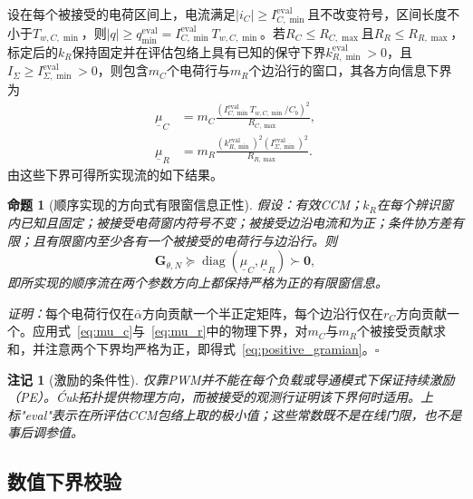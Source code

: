 \documentclass[zihao=5,a4paper]{ctexart}
\DeclareRobustCommand{\Cuk}{\mbox{\'{C}uk}}
\newcommand{\alphab}{\bar{\alpha}}
\newcommand{\vect}[1]{\bm{#1}}
\newtheorem{proposition}{命题}
\newtheorem{remark}{注记}
\begin{document}
设在每个被接受的电荷区间上，电流满足$|i_C|\ge I_{C,\min}^{\mathrm{eval}}$且不改变符号，区间长度不小于$T_{w,C,\min}$，则$|q|\ge q_{\min}^{\mathrm{eval}}=I_{C,\min}^{\mathrm{eval}}T_{w,C,\min}$。若$R_C\le R_{C,\max}$且$R_R\le R_{R,\max}$，标定后的$k_R$保持固定并在评估包络上具有已知的保守下界$k_{R,\min}^{\mathrm{eval}}>0$，且$I_\Sigma\ge I_{\Sigma,\min}^{\mathrm{eval}}>0$，则包含$m_C$个电荷行与$m_R$个边沿行的窗口，其各方向信息下界为
\begin{align}
\underline\mu_C & =m_C\frac{(I_{C,\min}^{\mathrm{eval}}T_{w,C,\min}/C_b)^2}{R_{C,\max}},
\label{eq:mu_c}\\
\underline\mu_R & =m_R\frac{(k_{R,\min}^{\mathrm{eval}})^2(I_{\Sigma,\min}^{\mathrm{eval}})^2}{R_{R,\max}}.
\label{eq:mu_r}
\end{align}
由这些下界可得所实现流的如下结果。

\begin{proposition}[顺序实现的方向式有限窗信息正性]
\label{prop:identifiability}
假设：有效CCM；$k_R$在每个辨识窗内已知且固定；被接受电荷窗内符号不变；被接受边沿电流和为正；条件协方差有限；且有限窗内至少各有一个被接受的电荷行与边沿行。则
\begin{equation}
\vect{G}_{\theta,N}\succeq
\operatorname{diag}(\underline\mu_C,\underline\mu_R)\succ\vect{0},
\label{eq:positive_gramian}
\end{equation}
即所实现的顺序流在两个参数方向上都保持严格为正的有限窗信息。
\end{proposition}

\emph{证明：}每个电荷行仅在$\alphab$方向贡献一个半正定矩阵，每个边沿行仅在$r_C$方向贡献一个。应用式~\eqref{eq:mu_c}与~\eqref{eq:mu_r}中的物理下界，对$m_C$与$m_R$个被接受贡献求和，并注意两个下界均严格为正，即得式~\eqref{eq:positive_gramian}。\hfill$\square$

\begin{remark}[激励的条件性]
\label{rem:conditional}
仅靠PWM并不能在每个负载或导通模式下保证持续激励（PE）。\Cuk{}拓扑提供物理方向，而被接受的观测行证明该下界何时适用。上标"eval"表示在所评估CCM包络上取的极小值；这些常数既不是在线门限，也不是事后调参值。
\end{remark}

\subsection{数值下界校验}
\end{document}
